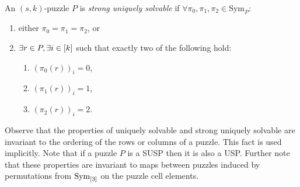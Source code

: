 \documentclass[11pt]{article}
\newcommand\Sym[1]{\ensuremath{\mathrm{Sym}_{#1}}}
\begin{document}

\begin{definition}
  ~\\
  An $(s,k)$-puzzle $P$ is \emph{strong uniquely solvable} if
  $\forall \pi_0, \pi_1, \pi_2 \in \Sym{P}:$
  \begin{enumerate}
  \item either $\pi_0 = \pi_1 = \pi_2$, or
  \item $\exists r \in P, \exists i \in [k]$ such that exactly two
    of the following hold:
    \begin{enumerate}
    \item $(\pi_0(r))_i = 0$,
    \item $(\pi_1(r))_i = 1$,
    \item $(\pi_2(r))_i = 2$.
    \end{enumerate}
  \end{enumerate}

\end{definition}

Observe that the properties of uniquely solvable and strong uniquely
solvable are invariant to the ordering of the rows or columns of a
puzzle.  This fact is used implicitly.  Note that if a puzzle $P$ is a
SUSP then it is also a USP.  Further note that these properties are
invariant to maps between puzzles induced by permutations from
\Sym{\ordset{3}} on the puzzle cell elements.
\end{document}
